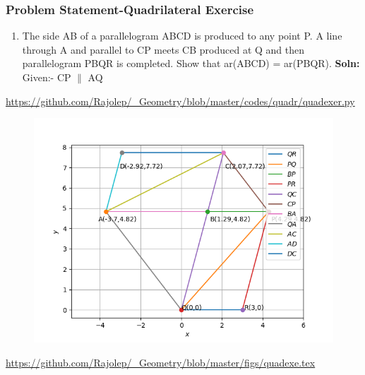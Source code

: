 \begin{frame}
\frametitle{Problem Statement-Quadrilateral Exercise}
\begin{enumerate}[label=(\roman*)]
\item The side AB of a parallelogram ABCD is produced to any point P. A line through A and
parallel to CP meets CB produced at Q and then parallelogram PBQR is completed. Show
that ar(ABCD) = ar(PBQR).
\textbf{Soln:}\\
Given:- CP $\parallel$ AQ
  \end{enumerate} 
\url{https://github.com/Rajolep/_Geometry/blob/master/codes/quadr/quadexer.py}
\begin{figure}
\includegraphics[scale=0.3]{./figs/quadexer.png}
\end{figure}
\end{frame}
\begin{frame}
\begin{figure}

\end{figure}
\url{https://github.com/Rajolep/_Geometry/blob/master/figs/quadexe.tex}
\end{frame}
